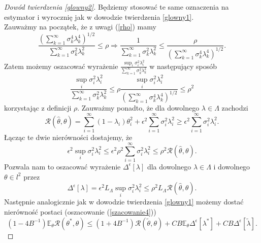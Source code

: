 \documentclass{mwart}
\begin{document}
\begin{proof}[Dowód twierdzenia \ref{glowny2}]
Będziemy stosować te same oznaczenia na estymator i wyrocznię jak w dowodzie twierdzenia \ref{glowny1}.\\
Zauważmy na początek, że z uwagi (\ref{rho}) mamy 
\begin{displaymath}
\frac{\left(\sum_{k=1}^{\infty}\sigma_k^4\lambda_k^4\right)^{1/2}}{\sum_{k=1}^{\infty}\sigma_k^2\lambda_k^2}\leq \rho \Longrightarrow \frac{1}{\sum_{k=1}^{\infty}\sigma_k^2\lambda_k^2}\leq \frac{\rho}{\left(\sum_{k=1}^{\infty}\sigma_k^4\lambda_k^4\right)^{1/2}}.
\end{displaymath}
Zatem możemy oszacować wyrażenie $\frac{\sup_i \sigma_i^2\lambda_i^2}{\sum_{k=1}^{\infty}\sigma_k^2\lambda_k^2}$ w następujący sposób
\begin{displaymath}
\frac{\sup_i \sigma_i^2\lambda_i^2}{\sum_{k=1}^{\infty}\sigma_k^2\lambda_k^2}\leq \rho \frac{\sup_i \sigma_i^2\lambda_i^2}{\left(\sum_{k=1}^{\infty}\sigma_k^4\lambda_k^4\right)^{1/2}}\leq \rho^2
\end{displaymath}
korzystając z definicji $\rho$. Zauważmy ponadto, że dla dowolnego $\lambda\in \Lambda$ zachodzi
\begin{displaymath}
\mathcal{R}(\hat{\theta},\theta)=\sum_{i=1}^{\infty}(1-\lambda_i)\theta^2_i+\epsilon^2\sum_{i=1}^{\infty}\sigma_i^2\lambda_i^2\geq \epsilon^2\sum_{i=1}^{\infty}\sigma_i^2\lambda_i^2.
\end{displaymath}
Łącząc te dwie nierówności dostajemy, że
\begin{displaymath}
\epsilon^2\sup_i \sigma_i^2\lambda_i^2\leq \epsilon^2\rho^2\sum_{i=1}^{\infty}\sigma_i^2\lambda_i^2\leq \rho^2\mathcal{R}(\hat{\theta},\theta).
\end{displaymath}
Pozwala nam to oszacować wyrażenie $\Delta^{\epsilon}[\lambda]$ dla dowolnego $\lambda\in \Lambda$ i dowolnego $\theta\in l^2$ przez
\begin{displaymath}
\Delta^{\epsilon}[\lambda]=\epsilon^2L_{\Lambda}\sup_i \sigma_i^2\lambda_i^2\leq \rho^2L_{\Lambda}\mathcal{R}(\hat{\theta},\theta).
\end{displaymath}
Następnie analogicznie jak w dowodzie twierdzenia \ref{glowny1} możemy dostać nierówność postaci (oszacowanie (\ref{szacowanie4}))
\begin{displaymath}
(1-4B^{-1})\mathbb{E}_{\theta}\mathcal{R}(\theta^*,\theta)\leq (1+4B^{-1})\mathcal{R}(\tilde{\theta},\theta)+CB\mathbb{E}_{\theta}\Delta^{\epsilon}[\lambda^*]+CB\Delta^{\epsilon}[\tilde{\lambda}].
\end{displaymath}

\end{proof}
\end{document}

